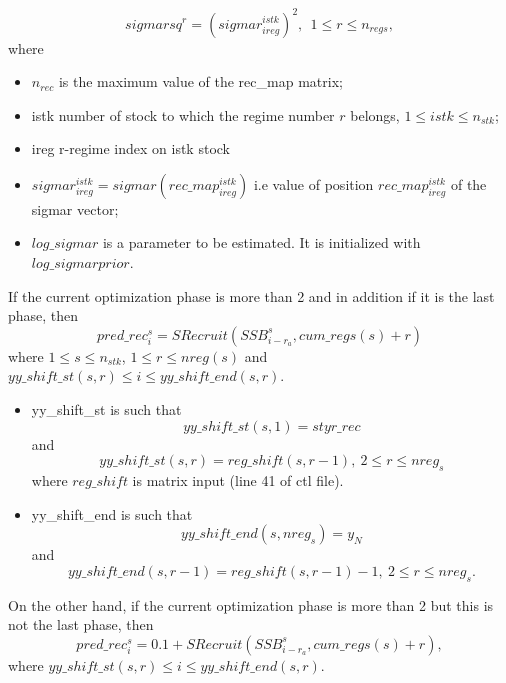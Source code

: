 \documentclass{article}
\begin{document}
\begin{equation}
    sigmarsq^r=(sigmar^{istk}_{ireg})^2, \ \ 1\leq r \leq n_{regs},
\end{equation}
where
\begin{itemize}
    \item $n_{rec}$ is the maximum value of the rec\_map matrix;
    \item istk number of stock to which the regime number $r$ belongs, $1\leq istk \leq n_{stk}$;
    \item ireg r-regime index on istk stock
    \item $sigmar^{istk}_{ireg}=sigmar(rec\_map^{istk}_{ireg})$ i.e value of position $rec\_map^{istk}_{ireg}$ of the sigmar vector; 
    \item $log\_sigmar$ is a parameter to be estimated. It is initialized with $log\_sigmarprior$.
\end{itemize}

If the current optimization phase is more than 2 and in addition if it is the last phase, then
\begin{equation}
    pred\_rec_{i}^s=SRecruit(SSB^s_{i-r_a},cum\_regs(s)+r)
\end{equation}
where $1\leq s \leq n_{stk}$, $1\leq r \leq nreg(s)$ and $yy\_shift\_st(s,r)\leq i \leq yy\_shift\_end(s,r)$.\\
\begin{itemize}
    \item yy\_shift\_st is such that $$yy\_shift\_st(s,1)=styr\_rec$$
    and
    \begin{equation*}
         yy\_shift\_st(s,r) = reg\_shift(s,r-1), \ 2\leq r \leq nreg_s
    \end{equation*}
    where $reg\_shift$ is matrix input (line 41 of ctl file).
    \item yy\_shift\_end is such that
    \begin{equation*}
        yy\_shift\_end(s,nreg_s)= y_N
    \end{equation*}
    and
    \begin{equation*}
        yy\_shift\_end(s,r-1)=reg\_shift(s,r-1)-1, \ 2 \leq r \leq nreg_s.
    \end{equation*}
\end{itemize}

On the other hand, if the current optimization phase is more than 2 but this is not the last phase, then
\begin{equation}
    pred\_rec^s_i = 0.1+SRecruit(SSB^s_{i-r_a},cum\_regs(s)+r),
\end{equation}
where $yy\_shift\_st(s,r)\leq i \leq yy\_shift\_end(s,r)$.\\
\end{document}
